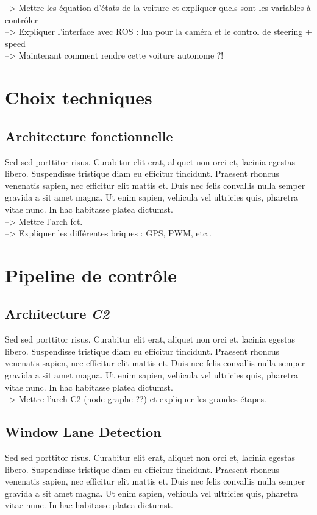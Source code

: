 \documentclass[12pt, openany]{report}
\begin{document}
--> Mettre les équation d'états de la voiture et expliquer quels sont les variables à contrôler\\

--> Expliquer l'interface avec ROS : lua pour la caméra et le control de steering + speed\\

--> Maintenant comment rendre cette voiture autonome ?!

\section{Choix techniques}
\subsection{Architecture fonctionnelle}
Sed sed porttitor risus. Curabitur elit erat, aliquet non orci et, lacinia egestas libero. Suspendisse tristique diam eu efficitur tincidunt. Praesent rhoncus venenatis sapien, nec efficitur elit mattis et. Duis nec felis convallis nulla semper gravida a sit amet magna. Ut enim sapien, vehicula vel ultricies quis, pharetra vitae nunc. In hac habitasse platea dictumst.\\

--> Mettre l'arch fct.\\

--> Expliquer les différentes briques : GPS, PWM, etc..

\section{Pipeline de contrôle}
\subsection{Architecture \textit{C2}}
Sed sed porttitor risus. Curabitur elit erat, aliquet non orci et, lacinia egestas libero. Suspendisse tristique diam eu efficitur tincidunt. Praesent rhoncus venenatis sapien, nec efficitur elit mattis et. Duis nec felis convallis nulla semper gravida a sit amet magna. Ut enim sapien, vehicula vel ultricies quis, pharetra vitae nunc. In hac habitasse platea dictumst.\\

--> Mettre l'arch C2 (node graphe ??) et expliquer les grandes étapes.

\subsection{Window Lane Detection}
Sed sed porttitor risus. Curabitur elit erat, aliquet non orci et, lacinia egestas libero. Suspendisse tristique diam eu efficitur tincidunt. Praesent rhoncus venenatis sapien, nec efficitur elit mattis et. Duis nec felis convallis nulla semper gravida a sit amet magna. Ut enim sapien, vehicula vel ultricies quis, pharetra vitae nunc. In hac habitasse platea dictumst.\\
\end{document}

